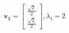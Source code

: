 \documentclass[preview]{standalone}
\begin{document}
\begin{align*}
\mathbf{v_1} = \begin{bmatrix} \frac{\sqrt{2}}{2} \\ \frac{\sqrt{2}}{2} \end{bmatrix}, \lambda_1 = 2
\end{align*}
\end{document}
